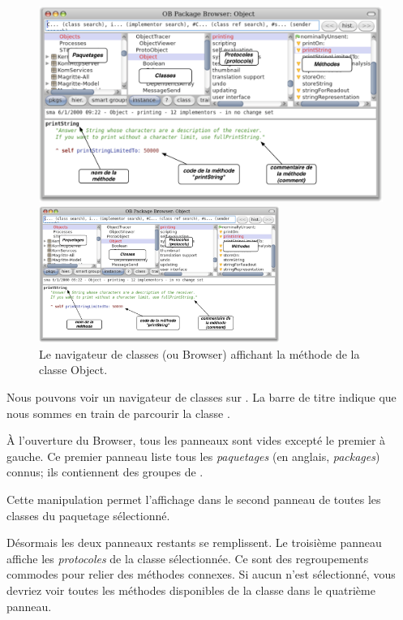 \documentclass[a4paper,10pt,twoside]{book}
\begin{document}
\begin{figure}[htb]
\ifluluelse
	{\centerline {\includegraphics[width=\textwidth]{ClassBrowser1}}}
	{\centerline {\includegraphics[width=0.7\textwidth]{ClassBrowser1}}}
\caption{Le navigateur de classes (ou Browser) affichant la
  méthode  de la classe Object.
}
\end{figure}

Nous pouvons voir un navigateur de classes sur .
La barre de titre indique que nous sommes en train de parcourir la
classe .

À l'ouverture du Browser, tous les panneaux sont vides excepté le premier à gauche.
Ce premier panneau liste tous les \emph{paquetages} 
(en anglais, \emph{packages}) connus; 
ils contiennent des groupes de . %

Cette manipulation permet l'affichage dans le second panneau de toutes les
classes du paquetage sélectionné.

Désormais les deux panneaux restants se remplissent.
Le troisième panneau affiche les \emph{protocoles} de la classe
sélectionnée.
Ce sont des regroupements commodes pour relier des méthodes
connexes. Si aucun  n'est sélectionné, vous devriez
voir toutes les méthodes disponibles de la classe dans le
quatrième panneau.
\end{document}
